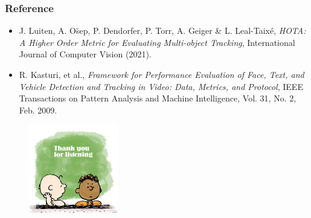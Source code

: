 \documentclass[slidetop, mathserif]{beamer}
\begin{document}
\begin{frame}
	\frametitle{Reference}

	\scriptsize

	\begin{minipage}{190pt}
	\begin{itemize}
	\item {\sf J. Luiten, A. O\u{s}ep, P. Dendorfer, P. Torr, A. Geiger \& L. Leal-Taix\'e},
		\emph{HOTA: A Higher Order Metric for Evaluating Multi-object Tracking}, International Journal of Computer Vision (2021).
	\item {\sf R. Kasturi, et al.},
		\emph{Framework for Performance Evaluation of Face, Text, and Vehicle Detection and Tracking in Video:
		Data, Metrics, and Protocol}, IEEE Transactions on Pattern Analysis and Machine Intelligence,
		Vol. 31, No. 2, Feb. 2009.
	\end{itemize}
	\end{minipage}
	\begin{minipage}{110pt}
		\begin{figure}
			\includegraphics[width=110pt]{pics/thank_you.png}
		\end{figure}
	\end{minipage}

\end{frame}
\end{document}
